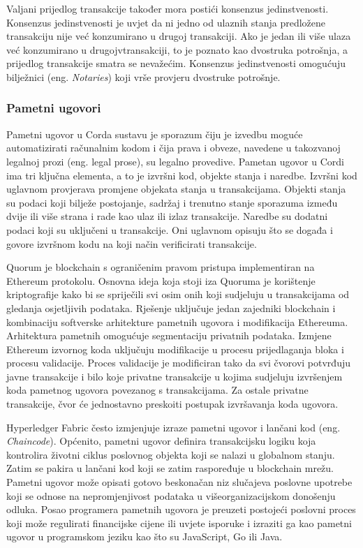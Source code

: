 \documentclass[times, utf8, diplomski]{fer}
\begin{document}
Valjani prijedlog transakcije također mora postići konsenzus jedinstvenosti. Konsenzus jedinstvenosti je uvjet da ni jedno od ulaznih stanja predložene transakciju nije već konzumirano u drugoj transakciji. Ako je jedan ili više ulaza već konzumirano u drugojvtransakciji, to je poznato kao dvostruka potrošnja, a prijedlog transakcije smatra se nevažećim. Konsenzus jedinstvenosti omogućuju bilježnici (eng. \textit{Notaries}) koji vrše provjeru dvostruke potrošnje.

\subsubsection{Pametni ugovori}
Pametni ugovor u Corda sustavu je sporazum čiju je izvedbu moguće automatizirati računalnim kodom i čija prava i obveze, navedene u takozvanoj legalnoj prozi (eng. legal prose), su legalno provedive. Pametan ugovor u Cordi ima tri ključna elementa, a to je izvršni kod, objekte stanja i naredbe. Izvršni kod uglavnom provjerava promjene objekata stanja u transakcijama. Objekti stanja su podaci koji bilježe postojanje, sadržaj i trenutno stanje sporazuma između dvije ili više strana i rade kao ulaz ili izlaz transakcije. Naredbe su dodatni podaci koji su uključeni u transakcije. Oni uglavnom opisuju što se događa i govore izvršnom kodu na koji način verificirati transakcije. 

Quorum je blockchain s ograničenim pravom pristupa implementiran na Ethereum protokolu. Osnovna ideja koja stoji iza Quoruma je korištenje kriptografije kako bi se spriječili svi osim onih koji sudjeluju u transakcijama od gledanja osjetljivih podataka. Rješenje uključuje jedan zajedniki blockchain i kombinaciju softverske arhitekture pametnih ugovora i modifikacija Ethereuma. Arhitektura pametnih omogućuje segmentaciju privatnih podataka. Izmjene Ethereum izvornog koda uključuju modifikacije u procesu prijedlaganja bloka i procesu validacije. Proces validacije je modificiran tako da svi čvorovi potvrđuju javne transakcije i bilo koje privatne transakcije u kojima sudjeluju izvršenjem koda pametnog ugovora povezanog s transakcijama. Za ostale privatne transakcije, čvor će jednostavno preskoiti postupak izvršavanja koda ugovora.

Hyperledger Fabric često izmjenjuje izraze pametni ugovor i lančani kod (eng. \textit{Chaincode}). Općenito, pametni ugovor definira transakcijsku logiku koja kontrolira životni ciklus poslovnog objekta koji se nalazi u globalnom stanju. Zatim se pakira u lančani kod koji se zatim raspoređuje u blockchain mrežu. Pametni ugovor može opisati gotovo beskonačan niz slučajeva poslovne upotrebe koji se odnose na nepromjenjivost podataka u višeorganizacijskom donošenju odluka. Posao programera pametnih ugovora je preuzeti postojeći poslovni proces koji može regulirati financijske cijene ili uvjete isporuke i izraziti ga kao pametni ugovor u programskom jeziku kao što su JavaScript, Go ili Java.
\end{document}
